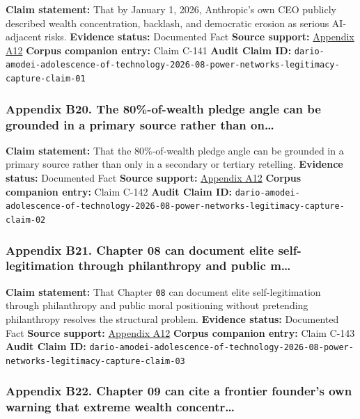 \documentclass[
  american,
  11pt,
  letterpaper,
]{article}
\begin{document}
\textbf{Claim statement:} That by January 1, 2026, Anthropic's own CEO
publicly described wealth concentration, backlash, and democratic
erosion as serious AI-adjacent risks. \textbf{Evidence status:}
Documented Fact \textbf{Source support:}
\hyperref[ch-08-appendix-a12-the-adolescence-of-technology]{Appendix
A12} \textbf{Corpus companion entry:} Claim C-141 \textbf{Audit Claim
ID:}
\texttt{dario-amodei-adolescence-of-technology-2026-08-power-networks-legitimacy-capture-claim-01}

\subsubsection{Appendix B20. The 80\%-of-wealth pledge angle can be
grounded in a primary source rather than
on\ldots{}}\label{ch-08-appendix-b20-the-80-of-wealth-pledge-angle-can-be-grounded-in-a-primary-source-rather-than-on}

\textbf{Claim statement:} That the 80\%-of-wealth pledge angle can be
grounded in a primary source rather than only in a secondary or tertiary
retelling. \textbf{Evidence status:} Documented Fact \textbf{Source
support:}
\hyperref[ch-08-appendix-a12-the-adolescence-of-technology]{Appendix
A12} \textbf{Corpus companion entry:} Claim C-142 \textbf{Audit Claim
ID:}
\texttt{dario-amodei-adolescence-of-technology-2026-08-power-networks-legitimacy-capture-claim-02}

\subsubsection{Appendix B21. Chapter 08 can document elite
self-legitimation through philanthropy and public
m\ldots{}}\label{ch-08-appendix-b21-chapter-08-can-document-elite-self-legitimation-through-philanthropy-and-public-m}

\textbf{Claim statement:} That Chapter \texttt{08} can document elite
self-legitimation through philanthropy and public moral positioning
without pretending philanthropy resolves the structural problem.
\textbf{Evidence status:} Documented Fact \textbf{Source support:}
\hyperref[ch-08-appendix-a12-the-adolescence-of-technology]{Appendix
A12} \textbf{Corpus companion entry:} Claim C-143 \textbf{Audit Claim
ID:}
\texttt{dario-amodei-adolescence-of-technology-2026-08-power-networks-legitimacy-capture-claim-03}

\subsubsection{Appendix B22. Chapter 09 can cite a frontier founder's
own warning that extreme wealth
concentr\ldots{}}\label{ch-08-appendix-b22-chapter-09-can-cite-a-frontier-founder-s-own-warning-that-extreme-wealth-concentr}
\end{document}
